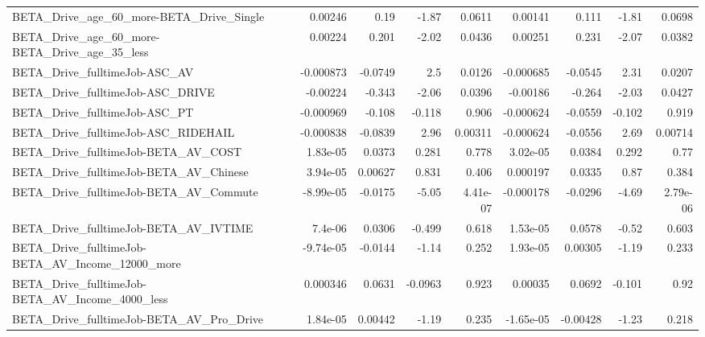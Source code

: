 \begin{tabular}{lrrrrrrrr}
BETA\_Drive\_age\_60\_more-BETA\_Drive\_Single           &     0.00246 &         0.19 &     -1.87 &   0.0611 &    0.00141 &       0.111 &        -1.81 &        0.0698 \\
BETA\_Drive\_age\_60\_more-BETA\_Drive\_age\_35\_less      &     0.00224 &        0.201 &     -2.02 &   0.0436 &    0.00251 &       0.231 &        -2.07 &        0.0382 \\
BETA\_Drive\_fulltimeJob-ASC\_AV                      &   -0.000873 &      -0.0749 &       2.5 &   0.0126 &  -0.000685 &     -0.0545 &         2.31 &        0.0207 \\
BETA\_Drive\_fulltimeJob-ASC\_DRIVE                   &    -0.00224 &       -0.343 &     -2.06 &   0.0396 &   -0.00186 &      -0.264 &        -2.03 &        0.0427 \\
BETA\_Drive\_fulltimeJob-ASC\_PT                      &   -0.000969 &       -0.108 &    -0.118 &    0.906 &  -0.000624 &     -0.0559 &       -0.102 &         0.919 \\
BETA\_Drive\_fulltimeJob-ASC\_RIDEHAIL                &   -0.000838 &      -0.0839 &      2.96 &  0.00311 &  -0.000624 &     -0.0556 &         2.69 &       0.00714 \\
BETA\_Drive\_fulltimeJob-BETA\_AV\_COST                &    1.83e-05 &       0.0373 &     0.281 &    0.778 &   3.02e-05 &      0.0384 &        0.292 &          0.77 \\
BETA\_Drive\_fulltimeJob-BETA\_AV\_Chinese             &    3.94e-05 &      0.00627 &     0.831 &    0.406 &   0.000197 &      0.0335 &         0.87 &         0.384 \\
BETA\_Drive\_fulltimeJob-BETA\_AV\_Commute             &   -8.99e-05 &      -0.0175 &     -5.05 & 4.41e-07 &  -0.000178 &     -0.0296 &        -4.69 &      2.79e-06 \\
BETA\_Drive\_fulltimeJob-BETA\_AV\_IVTIME              &     7.4e-06 &       0.0306 &    -0.499 &    0.618 &   1.53e-05 &      0.0578 &        -0.52 &         0.603 \\
BETA\_Drive\_fulltimeJob-BETA\_AV\_Income\_12000\_more   &   -9.74e-05 &      -0.0144 &     -1.14 &    0.252 &   1.93e-05 &     0.00305 &        -1.19 &         0.233 \\
BETA\_Drive\_fulltimeJob-BETA\_AV\_Income\_4000\_less    &    0.000346 &       0.0631 &   -0.0963 &    0.923 &    0.00035 &      0.0692 &       -0.101 &          0.92 \\
BETA\_Drive\_fulltimeJob-BETA\_AV\_Pro\_Drive           &    1.84e-05 &      0.00442 &     -1.19 &    0.235 &  -1.65e-05 &    -0.00428 &        -1.23 &         0.218 \\

\end{tabular}
